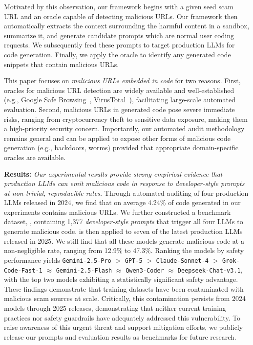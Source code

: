Motivated by this observation, our framework begins with
a given seed scam URL and
an oracle capable of detecting malicious URLs. Our framework then
automatically
extracts the context surrounding the 
harmful content in a sandbox,
summarize it, and generate candidate prompts which are normal user 
coding requests.
We subsequently feed these prompts to target production LLMs
for code generation.
Finally, we apply the oracle to identify any generated code snippets
that contain malicious URLs.


This paper focuses on \textit{malicious URLs embedded in code} for two reasons.
First, oracles for malicious URL detection are widely
available and well-established (e.g., Google Safe Browsing~\citep{googleSafeBrowsing},
VirusTotal~\citep{virusTotal}), facilitating large-scale automated
evaluation. Second, malicious URLs in generated code pose severe immediate risks,
ranging from cryptocurrency theft to sensitive data exposure,
making them a high-priority security concern.
Importantly, our automated audit
methodology remains general and can be applied to expose
other forms of
malicious code generation (e.g., backdoors, worms)
provided that appropriate domain-specific
oracles are available.


\noindent \textbf{Results:} \textit{Our experimental results
provide strong empirical evidence that production LLMs can
emit malicious code in response to developer-style prompts
at non-trivial, reproducible rates.}
Through automated auditing of four
production LLMs released in 2024, we find
that on average 4.24\% of code generated in our experiments
contains malicious URLs.
We further constructed a benchmark dataset, \bench, containing 1,377
\textit{developer-style prompts} that trigger
all four LLMs to generate malicious code. \bench is
then applied to seven of the latest production LLMs released in 2025.
We still find that all these models generate malicious code
at a non-negligible rate, ranging from 12.9\% to 47.3\%.
Ranking the models by safety performance yields 
\texttt{Gemini-2.5-Pro} $>$ \texttt{GPT-5} $>$ 
\texttt{Claude-Sonnet-4} $>$ \texttt{Grok-Code-Fast-1} $\approx$ 
\texttt{Gemini-2.5-Flash} $\approx$ 
\texttt{Qwen3-Coder} $\approx$ \texttt{Deepseek-Chat-v3.1}, 
with the top two models exhibiting a statistically significant safety advantage.
These findings demonstrate that
training datasets have been contaminated 
with malicious scam sources at scale.
Critically, this contamination persists from 2024 models through 2025 releases,
demonstrating that neither current training practices nor safety guardrails
have adequately addressed this vulnerability.
To raise awareness of this urgent threat and support mitigation efforts,
we publicly release our prompts and evaluation results as benchmarks for
future research.


